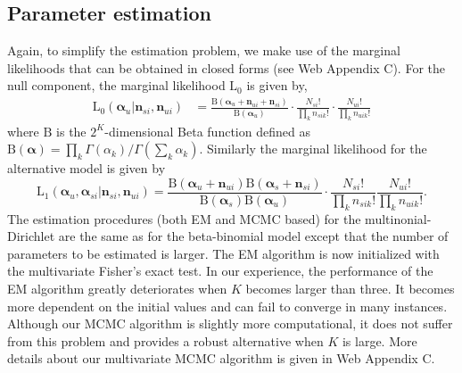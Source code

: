 \documentclass[useAMS,referee,usenatbib]{biom}
\begin{document}
\subsection{Parameter estimation}
Again, to simplify the estimation problem, we make use of the marginal likelihoods that can be obtained in closed forms (see Web Appendix C). For the null component, the marginal likelihood $\mathrm{L}_0$ is given by,
\begin{align*}
\mathrm{L}_0(\boldsymbol{\alpha}_u|\mathbf{n}_{si},\mathbf{n}_{ui}) &= \frac{ \mathrm{B}(\boldsymbol{\alpha}_{u}+\mathbf{n}_{ui}+\mathbf{n}_{si})}{\mathrm{B}(\boldsymbol{\alpha}_u)} \cdot \frac{N_{si}!}{\prod_k n_{sik}!} \cdot \frac{N_{ui}!}{\prod_k n_{uik}!}
\end{align*}
where $\mathrm{B}$ is the $2^K$-dimensional Beta function defined as $\mathrm{B}(\boldsymbol{\alpha})=\prod_k\Gamma(\alpha_k)/\Gamma(\sum_k\alpha_k)$. Similarly the marginal likelihood for the alternative model is given by 
\[
\mathrm{L}_1(\boldsymbol{\alpha}_u,\boldsymbol{\alpha}_{si}|\mathbf{n}_{si},\mathbf{n}_{ui}) =\frac{\mathrm{B}(\boldsymbol{\alpha}_{u}+\mathbf{n}_{ui}) \mathrm{B}(\boldsymbol{\alpha}_{s}+\mathbf{n}_{si})}{\mathrm{B}(\boldsymbol{\alpha}_s)\mathrm{B}(\boldsymbol{\alpha}_u)} \cdot \frac{N_{si}!}{\prod_k n_{sik}!} \frac{N_{ui}!}{\prod_k n_{uik}!}.%
\]
The estimation procedures (both EM and MCMC based) for the multinonial-Dirichlet are the same as for the beta-binomial model except that the number of parameters to be estimated is larger. The EM algorithm is now initialized with the multivariate Fisher's exact test. In our experience, the performance of the EM algorithm greatly deteriorates when $K$ becomes larger than three. It becomes more dependent on the initial values and can fail to converge in many instances. Although our MCMC algorithm is slightly more computational, it does not suffer from this problem and provides a robust alternative when $K$ is large. More details about our multivariate MCMC algorithm is given in Web Appendix C. 
\end{document}
